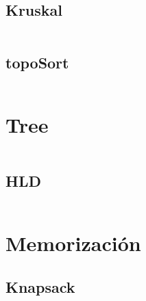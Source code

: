 \documentclass[10pt]{article}
\begin{document}
				\subsection{Kruskal}
					\inputminted[tabsize=2,breaklines,fontsize=\small]{c++}{Graph/Kruskal.cpp}
				\subsection{topoSort}
					\inputminted[tabsize=2,breaklines,fontsize=\small]{c++}{Graph/topoSort.cpp}
			\section{Tree}
				\inputminted[tabsize=2,breaklines,fontsize=\small]{c++}{Graph/Tree.cpp}
				\subsection{HLD}
					\inputminted[tabsize=2,breaklines,fontsize=\small]{c++}{Graph/HLD.cpp}
			\section{Memorización}
				\subsection{Knapsack}
					\inputminted[tabsize=2,breaklines,fontsize=\small]{c++}{Memorizacion/Knapsack.cpp}
		
		
	
\end{document}
